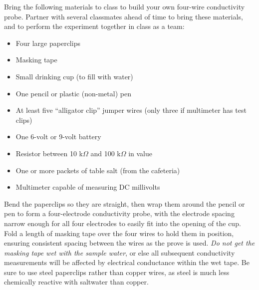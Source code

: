 
Bring the following materials to class to build your own four-wire conductivity probe.  Partner with several classmates ahead of time to bring these materials, and to perform the experiment together in class as a team:

\begin{itemize}
\item{} Four large paperclips 
\vskip 5pt
\item{} Masking tape
\vskip 5pt
\item{} Small drinking cup (to fill with water)
\vskip 5pt
\item{} One pencil or plastic (non-metal) pen
\vskip 5pt
\item{} At least five ``alligator clip'' jumper wires (only three if multimeter has test clips)
\vskip 5pt
\item{} One 6-volt or 9-volt battery
\vskip 5pt
\item{} Resistor between 10 k$\Omega$ and 100 k$\Omega$ in value
\vskip 5pt
\item{} One or more packets of table salt (from the cafeteria)
\vskip 5pt
\item{} Multimeter capable of measuring DC millivolts
\end{itemize}

Bend the paperclips so they are straight, then wrap them around the pencil or pen to form a four-electrode conductivity probe, with the electrode spacing narrow enough for all four electrodes to easily fit into the opening of the cup.  Fold a length of masking tape over the four wires to hold them in position, ensuring consistent spacing between the wires as the prove is used.  {\it Do not get the masking tape wet with the sample water}, or else all subsequent conductivity measurements will be affected by electrical conductance within the wet tape.  Be sure to use steel paperclips rather than copper wires, as steel is much less chemically reactive with saltwater than copper.

